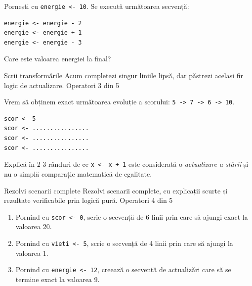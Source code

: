 \begin{guidebox}
Pornești cu \texttt{energie <- 10}. Se execută următoarea secvență:
\begin{lstlisting}[style=codequest]
energie <- energie - 2
energie <- energie + 1
energie <- energie - 3
\end{lstlisting}
Care este valoarea energiei la final?
\end{guidebox}

\clearpage

\PageHeader
  {Scrii transformările}
  {Acum completezi singur liniile lipsă, dar păstrezi același fir logic de actualizare.}
  {Operatori 3 din 5}

\begin{semibox}
Vrem să obținem exact următoarea evoluție a scorului: \texttt{5 -> 7 -> 6 -> 10}.
\begin{lstlisting}[style=codequest]
scor <- 5
scor <- ................
scor <- ................
scor <- ................
\end{lstlisting}
\end{semibox}

\begin{semibox}
Explică în 2-3 rânduri de ce \texttt{x <- x + 1} este considerată o \textit{actualizare a stării} și nu o simplă comparație matematică de egalitate.
\end{semibox}


\clearpage

\PageHeader
  {Rezolvi scenarii complete}
  {Rezolvi scenarii complete, cu explicații scurte și rezultate verificabile prin logică pură.}
  {Operatori 4 din 5}

\begin{solobox}
\begin{enumerate}
\item Pornind cu \texttt{scor <- 0}, scrie o secvență de 6 linii prin care să ajungi exact la valoarea 20.
\item Pornind cu \texttt{vieti <- 5}, scrie o secvență de 4 linii prin care să ajungi la valoarea 1.
\item Pornind cu \texttt{energie <- 12}, creează o secvență de actualizări care să se termine exact la valoarea 9.
\end{enumerate}
\end{solobox}

